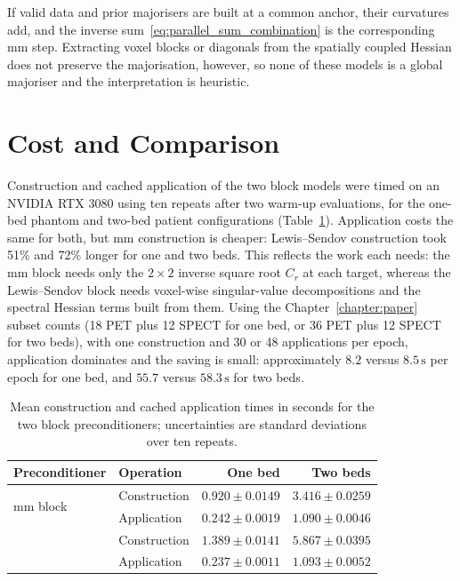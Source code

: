 If valid data and prior majorisers are built at a common anchor, their curvatures add, and the inverse sum~\eqref{eq:parallel_sum_combination} is the corresponding \gls{mm} step. Extracting voxel blocks or diagonals from the spatially coupled Hessian does not preserve the majorisation, however, so none of these models is a global majoriser and the interpretation is heuristic.

\section{Cost and Comparison}

Construction and cached application of the two block models were timed on an NVIDIA RTX 3080 using ten repeats after two warm-up evaluations, for the one-bed phantom and two-bed patient configurations (Table~\ref{tab:mm_preconditioner_cost}). Application costs the same for both, but \gls{mm} construction is cheaper: Lewis--Sendov construction took 51\% and 72\% longer for one and two beds. This reflects the work each needs: the \gls{mm} block needs only the $2\times2$ inverse square root $C_r$ at each target, whereas the Lewis--Sendov block needs voxel-wise singular-value decompositions and the spectral Hessian terms built from them. Using the Chapter~\ref{chapter:paper} subset counts (18 PET plus 12 SPECT for one bed, or 36 PET plus 12 SPECT for two beds), with one construction and 30 or 48 applications per epoch, application dominates and the saving is small: approximately $8.2$ versus $8.5\,\mathrm{s}$ per epoch for one bed, and $55.7$ versus $58.3\,\mathrm{s}$ for two beds.

\begin{table}[htbp]
    \centering
    \caption{Mean construction and cached application times in seconds for the two block preconditioners; uncertainties are standard deviations over ten repeats.}
    \label{tab:mm_preconditioner_cost}
    \small
    \begin{tabular}{@{}llrr@{}}
        \toprule
        Preconditioner & Operation & One bed & Two beds\\
        \midrule
        \multirow{2}{*}{\gls{mm} block}
            & Construction & $0.920 \pm 0.0149$ & $3.416 \pm 0.0259$\\
            & Application  & $0.242 \pm 0.0019$ & $1.090 \pm 0.0046$\\
        \addlinespace
        \multirow{2}{*}{Lewis--Sendov block}
            & Construction & $1.389 \pm 0.0141$ & $5.867 \pm 0.0395$\\
            & Application  & $0.237 \pm 0.0011$ & $1.093 \pm 0.0052$\\
        \bottomrule
    \end{tabular}
\end{table}

